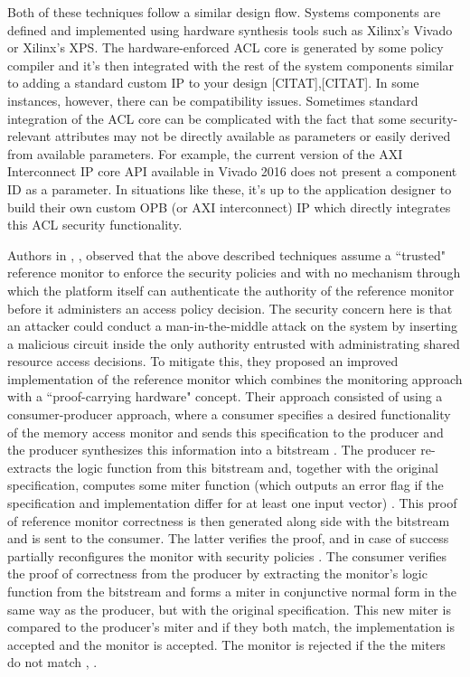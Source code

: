 \documentclass[sigconf]{acmart}
\theoremstyle{plain}
\theoremstyle{remark}
\begin{document}
Both of these techniques follow a similar design flow. Systems components are defined and implemented using hardware synthesis tools such as Xilinx's Vivado or Xilinx's XPS.  The hardware-enforced ACL core is generated by some policy compiler and it's then integrated with the rest of the system components similar to adding a standard custom IP to your design [CITAT],[CITAT]. In some instances, however, there can be compatibility issues. Sometimes standard integration of the ACL core can be complicated with the fact that some security-relevant attributes may not be directly available as parameters or easily derived from available parameters. For example, the current version of the AXI Interconnect IP core API available in Vivado 2016 does not present a component ID as a parameter. In situations like these, it's up to the application designer to build their own custom OPB (or AXI interconnect) IP which directly integrates this ACL security functionality.

Authors in \cite{proofcarrying}, \cite{proof}, \cite{proofcar} observed that the above described techniques assume a ``trusted" reference monitor to enforce the security policies and with no mechanism through which the platform itself can authenticate the authority of the reference monitor before it administers an access policy decision. The security concern here is that an attacker could conduct a man-in-the-middle attack on the system by inserting a malicious circuit inside the only authority entrusted with administrating shared resource access decisions. To mitigate this, they proposed an improved implementation of the reference monitor which combines the monitoring approach with a ``proof-carrying hardware" concept. Their approach consisted of using a consumer-producer approach, where a consumer specifies a desired functionality of the memory access monitor and sends this specification to the producer and the producer synthesizes this information into a bitstream \cite{proofcarrying}. The producer re-extracts the logic function from this bitstream and, together with the original specification, computes some miter function (which outputs an error flag if the specification and implementation differ for at least one input vector) \cite{proof}. This proof of reference monitor correctness is then generated along side with the bitstream and is sent to the consumer. The latter verifies the proof, and in case of success partially reconfigures the monitor with security policies \cite{proof}. The consumer verifies the proof of correctness from the producer by extracting the monitor's logic function from the bitstream and forms a miter in conjunctive normal form in the same way as the producer, but with the original specification. This new miter is compared to the producer's miter and if they both match, the implementation is accepted and the monitor is accepted. The monitor is rejected if the the miters do not match \cite{proof}, \cite{proofcar}.
\end{document}
